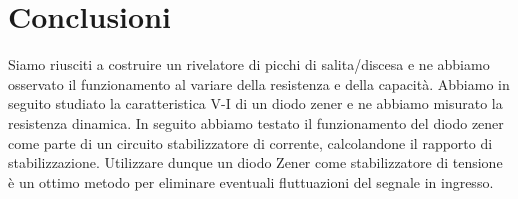 \section{Conclusioni}

Siamo riusciti a costruire un rivelatore di picchi di salita/discesa e ne abbiamo osservato il funzionamento al variare della resistenza e della capacità.
Abbiamo in seguito studiato la caratteristica V-I di un diodo zener e ne abbiamo misurato la resistenza dinamica. In seguito abbiamo testato il funzionamento del diodo zener come parte di un circuito stabilizzatore di corrente, calcolandone il rapporto di stabilizzazione.
Utilizzare dunque un diodo Zener come stabilizzatore di tensione è un ottimo metodo per eliminare eventuali fluttuazioni del segnale in ingresso.